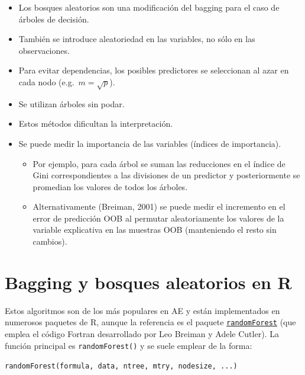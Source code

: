 \documentclass[
]{book}
\theoremstyle{break}
\theoremstyle{definition}
\theoremstyle{definition}
\theoremstyle{definition}
\theoremstyle{definition}
\theoremstyle{remark}
\begin{document}
\begin{itemize}
\item
  Los bosques aleatorios son una modificación del bagging para el caso de árboles de decisión.
\item
  También se introduce aleatoriedad en las variables, no sólo en las observaciones.
\item
  Para evitar dependencias, los posibles predictores se seleccionan al azar en cada nodo (e.g.~\(m=\sqrt{p}\)).
\item
  Se utilizan árboles sin podar.
\item
  Estos métodos dificultan la interpretación.
\item
  Se puede medir la importancia de las variables (índices de importancia).

  \begin{itemize}
  \item
    Por ejemplo, para cada árbol se suman las reducciones en el
    índice de Gini correspondientes a las divisiones de un
    predictor y posteriormente se promedian los valores de todos
    los árboles.
  \item
    Alternativamente (Breiman, 2001) se puede medir el incremento en el error de
    predicción OOB al permutar aleatoriamente los valores de la
    variable explicativa en las muestras OOB (manteniendo el resto
    sin cambios).
  \end{itemize}
\end{itemize}

\hypertarget{bagging-rf-r}{%
\section{Bagging y bosques aleatorios en R}\label{bagging-rf-r}}

Estos algoritmos son de los más populares en AE y están implementados en numerosos paquetes de R, aunque la referencia es el paquete \href{https://CRAN.R-project.org/package=randomForest}{\texttt{randomForest}} (que emplea el código Fortran desarrollado por Leo Breiman y Adele Cutler).
La función principal es \texttt{randomForest()} y se suele emplear de la forma:

\texttt{randomForest(formula,\ data,\ ntree,\ mtry,\ nodesize,\ ...)}
\end{document}
